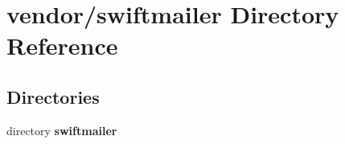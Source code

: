 \section{vendor/swiftmailer Directory Reference}
\label{dir_02d7c92db85ea1c7d3452cb90ff58333}
\subsection*{Directories}
\begin{DoxyCompactItemize}
\item 
directory {\bf swiftmailer}
\end{DoxyCompactItemize}
